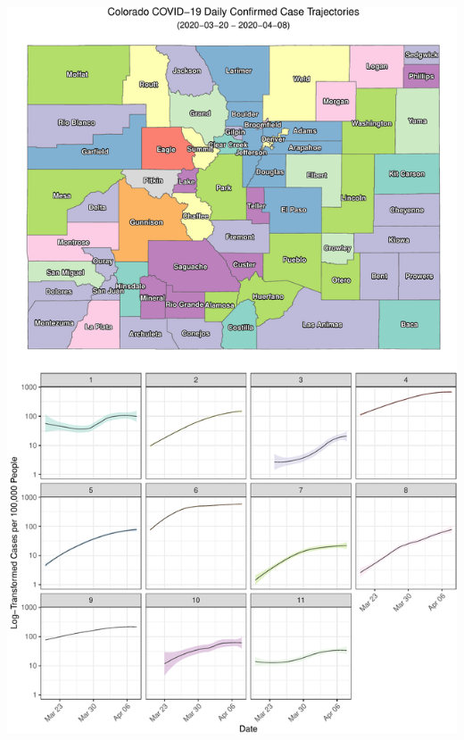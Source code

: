 \documentclass[]{article}
\begin{document}
\includegraphics{figs/county-clusters-smooth-log-1.pdf}
\end{document}
